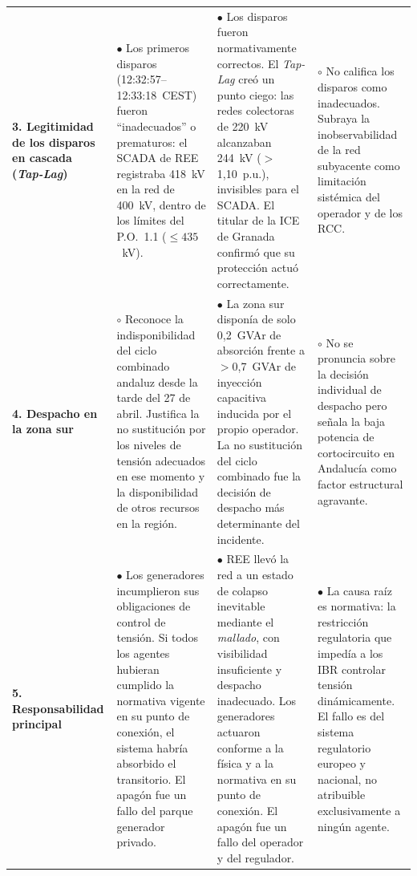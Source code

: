 \begin{landscape}
\begin{table}[H]
\begin{tabular}{p{3.2cm} p{6.5cm} p{6.5cm} p{5.5cm}}
\textbf{3. Legitimidad de los disparos en cascada (\textit{Tap-Lag})}
&
$\bullet$ Los primeros disparos (12:32:57--12:33:18~CEST) fueron
``inadecuados'' o prematuros: el SCADA de REE registraba 418~kV en la
red de 400~kV, dentro de los límites del P.O.~1.1 ($\leq 435$~kV).
&
$\bullet$ Los disparos fueron normativamente correctos. El
\textit{Tap-Lag} creó un punto ciego: las redes colectoras de 220~kV
alcanzaban 244~kV ($>$1,10~p.u.), invisibles para el SCADA. El titular
de la ICE de Granada confirmó que su protección actuó correctamente.
&
$\circ$ No califica los disparos como inadecuados. Subraya la
inobservabilidad de la red subyacente como limitación sistémica del
operador y de los RCC. \\
\addlinespace\midrule

\textbf{4. Despacho en la zona sur}
&
$\circ$ Reconoce la indisponibilidad del ciclo combinado andaluz
desde la tarde del 27 de abril. Justifica la no sustitución por los
niveles de tensión adecuados en ese momento y la disponibilidad de
otros recursos en la región.
&
$\bullet$ La zona sur disponía de solo 0,2~GVAr de absorción frente a
$>$0,7~GVAr de inyección capacitiva inducida por el propio operador.
La no sustitución del ciclo combinado fue la decisión de despacho
más determinante del incidente.
&
$\circ$ No se pronuncia sobre la decisión individual de despacho
pero señala la baja potencia de cortocircuito en Andalucía como
factor estructural agravante. \\
\addlinespace\midrule

\textbf{5. Responsabilidad principal}
&
$\bullet$ Los generadores incumplieron sus obligaciones de control de
tensión. Si todos los agentes hubieran cumplido la normativa vigente
en su punto de conexión, el sistema habría absorbido el transitorio.
El apagón fue un fallo del parque generador privado.
&
$\bullet$ REE llevó la red a un estado de colapso inevitable mediante
el \textit{mallado}, con visibilidad insuficiente y despacho
inadecuado. Los generadores actuaron conforme a la física y a la
normativa en su punto de conexión. El apagón fue un fallo del
operador y del regulador.
&
$\bullet$ La causa raíz es normativa: la restricción regulatoria que
impedía a los IBR controlar tensión dinámicamente. El fallo es del
sistema regulatorio europeo y nacional, no atribuible exclusivamente
a ningún agente. \\

\bottomrule
\end{tabular}
\end{table}
\end{landscape}

